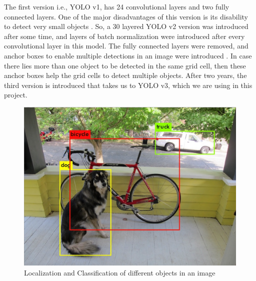 The first version i.e., YOLO v1, has 24 convolutional layers and two fully connected layers. One of the major disadvantages of this version is its disability to detect very small objects \cite{chap_5_article:1}. So, a 30 layered YOLO v2 version was introduced after some time, and layers of batch normalization were introduced after every convolutional layer in this model. The fully connected layers were removed, and anchor boxes to enable multiple detections in an image were introduced \cite{chap_5_article:2}. In case there lies more than one object to be detected in the same grid cell, then these anchor boxes help the grid cells to detect multiple objects. After two years, the third version is introduced that takes us to YOLO v3, which we are using in this project.
\begin{figure}[H]
    \centering
    \captionsetup{justification = centering}
    \includegraphics[scale= 0.25]{CHAPTERS/Chapter-5/images/5.1.png}
    \caption{Localization and Classification of different objects in an image } 
    \label{fig:5.1}
  \end{figure}
